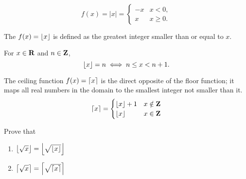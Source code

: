 \begin{definition}
\[ f(x)=|x|=\begin{cases}
-x & x<0, \\
x & x\ge0.
\end{cases} \]
\end{definition}

\begin{definition}
The  $f(x)=\left\lfloor x \right\rfloor$ is defined as the greatest integer smaller than or equal to $x$.

For $x\in\mathbf R$ and $n\in\mathbf Z$,
\[ \left\lfloor x \right\rfloor=n\iff n\le x<n+1. \]
\end{definition}

\begin{definition}
The ceiling function $f(x)=\left\lceil x \right\rceil$ is the direct opposite of the floor function; it maps all real numbers in the domain to the smallest integer not smaller than it.
\[ \left\lceil x \right\rceil=\begin{cases}
\left\lfloor x \right\rfloor+1 & x\notin\mathbf Z \\
\left\lfloor x \right\rfloor & x\in\mathbf Z
\end{cases} \]
\end{definition}

\begin{exercise}
Prove that
\begin{enumerate}[label=(\alph*)]
\item $\left\lfloor \sqrt{x} \right\rfloor=\left\lfloor \sqrt{\left\lfloor x \right\rfloor} \right\rfloor$
\item $\left\lceil \sqrt{x} \right\rceil=\left\lceil \sqrt{\left\lceil x \right\rceil} \right\rceil$
\end{enumerate}
\end{exercise}

